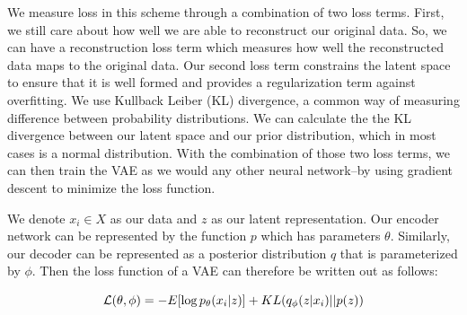 We measure loss in this scheme through a combination of two loss terms.
First, we still care about how well we are able to reconstruct our original data.
So, we can have a reconstruction loss term which measures how well the reconstructed data maps to the original data.
Our second loss term constrains the latent space to ensure that it is well formed and provides a regularization term against overfitting.
We use Kullback Leiber (KL) divergence, a common way of measuring difference between probability distributions.
We can calculate the the KL divergence between our latent space and our prior distribution, which in most cases is a normal distribution.
With the combination of those two loss terms, we can then train the VAE as we would any other neural network--by using gradient descent to minimize the loss function.

We denote $x_i \in X$ as our data and $z$ as our latent representation.
Our encoder network can be represented by the function $p$ which has parameters $\theta$.
Similarly, our decoder can be represented as a posterior distribution $q$ that is parameterized by $\phi$.
Then the loss function of a VAE can therefore be written out as follows:

\begin{equation}\label{eqn:vae-loss}
\mathcal{L}(\theta, \phi) = - E[\log p_{\theta}(x_i | z)] + KL(q_{\phi}(z | x_i) || p(z)) \\
\end{equation}